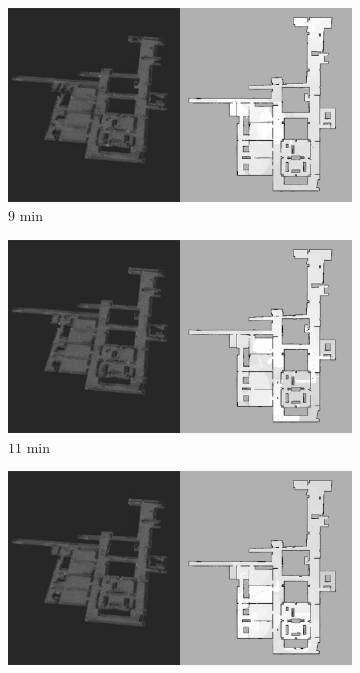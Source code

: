 \documentclass[smallextended]{svjour3}       %
\begin{document}
\begin{figure}[!t]
\begin{subfigure}[t]{0.38\columnwidth}
          	\includegraphics[trim={35cm 0cm 0cm 0cm}, clip, width=\textwidth]{Patrol_Split_Screen_9min.jpg}
        		\caption{$9$ min}
		\vspace*{0.05\textwidth}
    	\end{subfigure}
	\hspace*{0.05\textwidth}
    	\begin{subfigure}[t]{0.38\columnwidth}
           	\centering
          	\includegraphics[trim={35cm 0cm 0cm 0cm}, clip, width=\textwidth]{Patrol_Split_Screen_11min.jpg}
        		\caption{$11$ min}
		\vspace*{0.05\textwidth}
    	\end{subfigure}
    	\begin{subfigure}[t]{0.38\columnwidth}
           	\centering
          	\includegraphics[trim={35cm 0cm 0cm 0cm}, clip, width=\textwidth]{Patrol_Split_Screen_13min.jpg}

\end{subfigure}
\end{figure}
\end{document}
